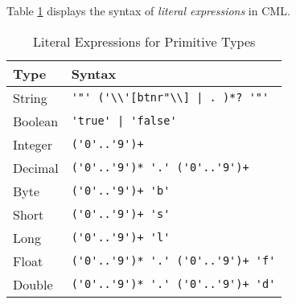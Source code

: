 Table \ref{tab:literal-expr-syntax} displays the syntax of \emph{literal expressions}
in CML.

\begin{table}[H]
\centering
\begin{tabular}
{ l l }
\hline
Type & Syntax \\
\hline
String & \verb!'"' ('\\'[btnr"\\] | . )*? '"'! \\
Boolean & \verb!'true' | 'false'! \\
Integer & \verb!('0'..'9')+! \\
Decimal & \verb!('0'..'9')* '.' ('0'..'9')+! \\
Byte & \verb!('0'..'9')+ 'b'! \\
Short & \verb!('0'..'9')+ 's'! \\
Long & \verb!('0'..'9')+ 'l'! \\
Float & \verb!('0'..'9')* '.' ('0'..'9')+ 'f'! \\
Double & \verb!('0'..'9')* '.' ('0'..'9')+ 'd'!
\end{tabular}
\caption{Literal Expressions for Primitive Types}
\label{tab:literal-expr-syntax}
\end{table}
